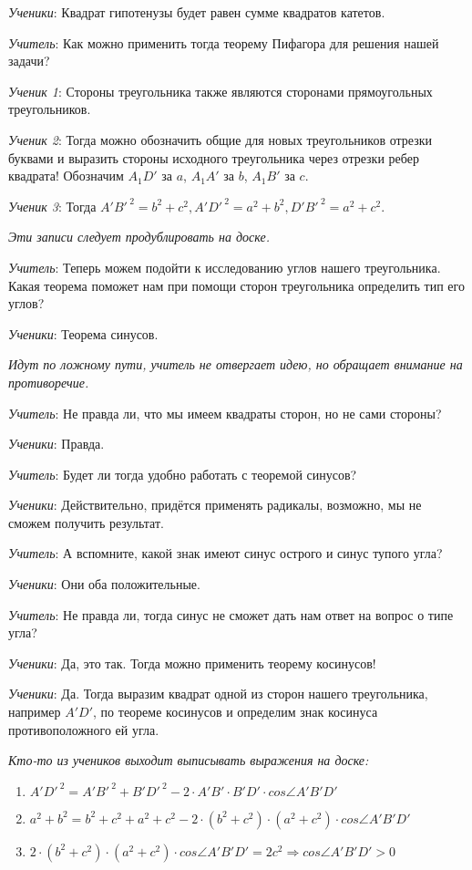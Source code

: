 \documentclass[a4paper,14pt,russian]{extreport}
\begin{document}
\textit{Ученики}: Квадрат гипотенузы будет равен сумме квадратов катетов.

\textit{Учитель}: Как можно применить тогда теорему Пифагора для решения нашей задачи?

\textit{Ученик 1}: Стороны треугольника также являются сторонами прямоугольных треугольников.

\textit{Ученик 2}: Тогда можно обозначить общие для новых треугольников отрезки буквами и выразить стороны исходного треугольника через отрезки ребер квадрата! Обозначим  $A_1D'$ за $a$, $A_1A'$  за $b$, $A_1B'$  за $c$.

\textit{Ученик 3}: Тогда $A'B'^{\ 2}=b^2+c^2, A'D'^{\ 2}=a^2+b^2, D'B'^{\ 2}=a^2+c^2$. 

\textit{Эти записи следует продублировать на доске.}

\textit{Учитель}: Теперь можем подойти к исследованию углов нашего треугольника. Какая теорема поможет нам при помощи сторон треугольника определить тип его углов?

\textit{Ученики}: Теорема синусов.

\textit{Идут по ложному пути, учитель не отвергает идею, но обращает внимание на противоречие.}

\textit{Учитель}: Не правда ли, что мы имеем квадраты сторон, но не сами стороны?

\textit{Ученики}: Правда.

\textit{Учитель}: Будет ли тогда удобно работать с теоремой синусов?

\textit{Ученики}: Действительно, придётся применять радикалы, возможно,  мы не сможем получить результат.

\textit{Учитель}: А вспомните, какой знак имеют синус острого и синус тупого угла?

\textit{Ученики}: Они оба положительные.

\textit{Учитель}: Не правда ли, тогда синус не сможет дать нам ответ на вопрос о типе угла?

\textit{Ученики}: Да, это так. Тогда можно применить теорему косинусов!

\textit{Ученики}: Да. Тогда выразим квадрат одной из сторон нашего треугольника, например $A'D'$,  по теореме косинусов и определим знак косинуса противоположного ей угла.

\textit{Кто-то из учеников выходит выписывать выражения на доске:}

\begin{enumerate}
    \item $A'D'^{\ 2}= A'B'^{\ 2} + B'D'^{\ 2} - 2\cdot A'B'\cdot B'D'\cdot cos\angle A'B'D'$
    \item $a^2 + b^2 = b^2 + c^2 + a^2 + c^2 - 2 \cdot(b^2 + c^2)\cdot(a^2 + c^2)\cdot cos\angle A'B'D'$
    \item $2 \cdot(b^2 + c^2)\cdot(a^2 + c^2)\cdot cos\angle A'B'D' = 2c^2\Rightarrow cos\angle A'B'D' > 0$
\end{enumerate}
\end{document}
